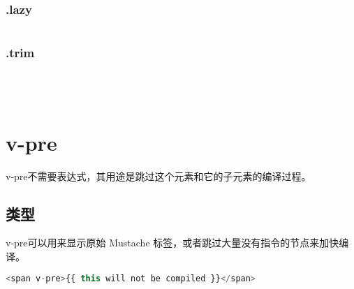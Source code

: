 \subsection{.lazy}


\begin{lstlisting}[language=JavaScript]

\end{lstlisting}


\subsection{.trim}


\begin{lstlisting}[language=JavaScript]

\end{lstlisting}




\begin{lstlisting}[language=JavaScript]

\end{lstlisting}




\begin{lstlisting}[language=JavaScript]

\end{lstlisting}




\begin{lstlisting}[language=JavaScript]

\end{lstlisting}

\chapter{v-pre}



v-pre不需要表达式，其用途是跳过这个元素和它的子元素的编译过程。

\section{类型}

v-pre可以用来显示原始 Mustache 标签，或者跳过大量没有指令的节点来加快编译。


\begin{lstlisting}[language=JavaScript]
<span v-pre>{{ this will not be compiled }}</span>
\end{lstlisting}



